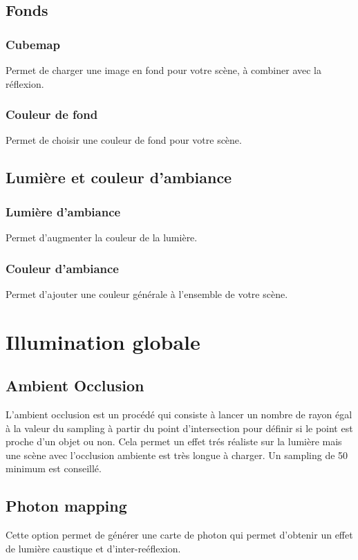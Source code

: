 \documentclass{report}
\begin{document}
\section{Fonds}
\subsection{Cubemap}
Permet de charger une image en fond pour votre sc\`ene, \`a combiner avec la r\'eflexion.
\subsection{Couleur de fond}
Permet de choisir une couleur de fond pour votre sc\`ene.
\section{Lumi\`ere et couleur d'ambiance}
\subsection{Lumi\`ere d'ambiance}
Permet d'augmenter la couleur de la lumi\`ere.
\subsection{Couleur d'ambiance}
Permet d'ajouter une couleur g\'en\'erale \`a l'ensemble de votre sc\`ene.
\chapter{Illumination globale}
\section{Ambient Occlusion}
L'ambient occlusion est un proc\'ed\'e qui consiste \`a lancer un nombre de rayon \'egal \`a la valeur du sampling \`a partir du point d'intersection pour d\'efinir si le point est proche d'un objet ou non.
\newline Cela permet un effet tr\'es r\'ealiste sur la lumi\`ere mais une sc\`ene avec l'occlusion ambiente est tr\`es longue \`a charger.
\newline Un sampling de 50 minimum est conseill\'e.
\section{Photon mapping}
Cette option permet de g\'en\'erer une carte de photon qui permet d'obtenir un effet de lumi\`ere caustique et d'inter-re\'eflexion.
\end{document}
